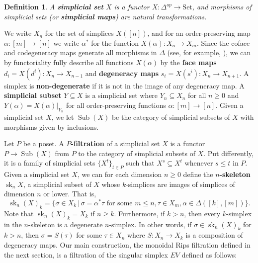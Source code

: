 \documentclass[a4paper,11pt]{article}
\newcommand{\Set}{\mathrm{Set}}
\newcounter{dummy}\numberwithin{dummy}{section}
\newtheorem{definition}[dummy]{Definition}
\theoremstyle{remark}
\begin{document}
\begin{definition}
    A \textbf{simplicial set} $X$ is a functor $X\colon \Delta^{op}\to\Set$, and morphisms of simplicial sets (or \textbf{simplicial maps}) are natural transformations.
\end{definition}

We write $X_n$ for the set of simplices $X([n])$, and for an order-preserving map $\alpha\colon [m]\to[n]$ we write $\alpha^*$ for the function $X(\alpha)\colon X_n\to X_m$. Since the coface and codegeneracy maps generate all morphisms in $\Delta$ (see, for example, \cite[p.~177]{mac2013categories}), we can by functoriality fully describe all functions $X(\alpha)$ by the \textbf{face maps} $d_i=X(d^i)\colon X_n\to X_{n-1}$ and \textbf{degeneracy maps} $s_i=X(s^i)\colon X_n \to X_{n+1}$. A simplex is \textbf{non-degenerate} if it is not in the image of any degeneracy map. A \textbf{simplicial subset} $Y\subseteq X$ is a simplicial set where $Y_n\subseteq X_n$ for all $n\geq 0$ and $Y(\alpha)=X(\alpha)|_{Y_n}$ for all order-preserving functions $\alpha\colon [m]\to[n]$. Given a simplicial set $X$, we let $\operatorname{Sub}(X)$ be the category of simplicial subsets of $X$ with morphisms given by inclusions.

Let $P$ be a poset. A \textbf{$P$-filtration} of a simplicial set $X$ is a functor $P\to\operatorname{Sub}(X)$ from $P$ to the category of simplicial subsets of $X$. Put differently, it is a family of simplicial sets $\{X^t\}_{t\in P}$ such that $X^s\subseteq X^t$ whenever $s\leq t$ in $P$. Given a simplicial set $X$, we can for each dimension $n\geq 0$ define the \textbf{$n$-skeleton} $\operatorname{sk}_n X$, a simplicial subset of $X$ whose $k$-simplices are images of simplices of dimension $n$ or lower. That is,
\begin{equation*}
    \operatorname{sk}_n(X)_k=\{\sigma \in X_k \,|\, \sigma=\alpha^*\tau \textrm{ for some }m\leq n, \tau\in X_m, \alpha\in\Delta([k],[m])\}.
\end{equation*}
Note that $\operatorname{sk}_n(X)_k=X_k$ if $n\geq k$. Furthermore, if $k>n$, then every $k$-simplex in the $n$-skeleton is a degenerate $n$-simplex. In other words, if $\sigma\in\operatorname{sk}_n(X)_k$ for $k>n$, then  $\sigma = S(\tau)$ for some $\tau \in X_n $ where $S\colon X_n\to X_k$ is a composition of degeneracy maps. Our main construction, the monoidal Rips filtration defined in the next section, is a filtration of the singular simplex $EV$ defined as follows:
\end{document}
